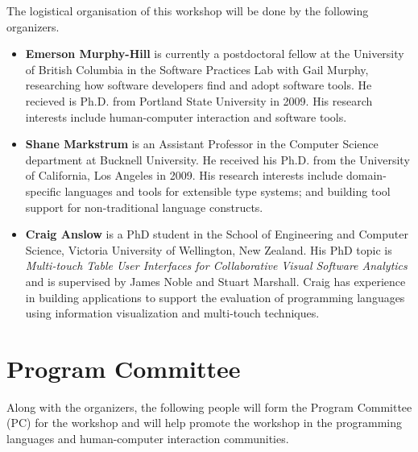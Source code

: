 \documentclass[authorpermission]{sigplanconf}
\begin{document}
The logistical organisation of this workshop will be done by the following organizers.

\begin{itemize}
\item \textbf{Emerson Murphy-Hill} is currently a
  postdoctoral fellow at the University of British Columbia in the
  Software Practices Lab with Gail Murphy, researching how 
  software developers find and adopt software tools.
  He recieved is Ph.D. from Portland State University in 2009.
  His research interests include human-computer interaction and software tools. 

\item \textbf{Shane Markstrum} is an Assistant Professor in the Computer Science
  department at Bucknell University. He received his Ph.D. from the University of
  California, Los Angeles in 2009. His research interests include
  domain-specific languages and tools for extensible type systems; and 
  building tool support for non-traditional language constructs.
  
\item \textbf{Craig Anslow} is a PhD student in the School of
  Engineering and Computer Science, Victoria University of Wellington,
  New Zealand. His PhD topic is \emph{Multi-touch Table User
    Interfaces for Collaborative Visual Software Analytics} and is
  supervised by James Noble and Stuart Marshall. Craig has experience
  in building applications to support the evaluation of programming
  languages using information visualization and multi-touch
  techniques.

\end{itemize}

\section{Program Committee}

Along with the organizers, the following people will form the Program
Committee (PC) for the workshop and will help promote the workshop in
the programming languages and human-computer interaction communities.
\end{document}

